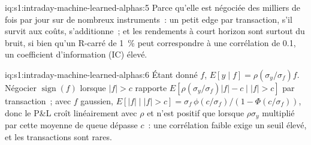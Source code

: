 \begin{solution}{iq:s1:intraday-machine-learned-alphas:5}
Parce qu'elle est négociée des milliers de fois par jour sur de nombreux instruments~: un petit edge par transaction, s'il survit aux coûts, s'additionne~; et les rendements à court horizon sont
surtout du bruit, si bien qu'un R-carré de 1~\% peut correspondre à une corrélation de 0.1, un coefficient d'information (IC) élevé.
\end{solution}

\begin{solution}{iq:s1:intraday-machine-learned-alphas:6}
Étant donné $f$, $E[y \mid f] = \rho(\sigma_y/\sigma_f)f$. Négocier $\operatorname{sign}(f)$ lorsque $|f| > c$ rapporte $E[\rho(\sigma_y/\sigma_f)|f| - c \mid |f| > c]$ par
transaction~; avec $f$ gaussien, $E[|f| \mid |f| > c] = \sigma_f\,\phi(c/\sigma_f)/(1 - \Phi(c/\sigma_f))$, donc le P\&L croît linéairement avec
$\rho$ et n'est positif que lorsque $\rho\sigma_y$ multiplié par cette moyenne de queue dépasse $c$~: une corrélation faible exige un seuil élevé, et les transactions sont rares.
\end{solution}
